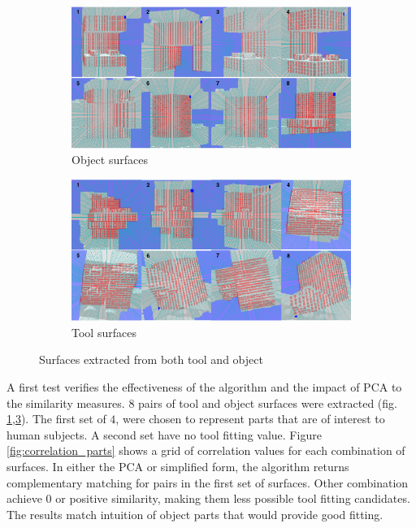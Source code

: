 \documentclass[
    floatsintext
]{article}
\begin{document}
\begin{figure}[!h]
  \centering
  \begin{subfigure}{1\textwidth}
    \includegraphics[width=1\linewidth]{./figures/object_parts.png}
    \caption{Object surfaces}
    \label{fig:obj_parts}
  \end{subfigure}
  \begin{subfigure}{1\textwidth}
    \includegraphics[width=1\linewidth]{./figures/tool_parts.png}
    \caption{Tool surfaces}
    \label{fig:tool_part}
  \end{subfigure}
  \caption{Surfaces extracted from both tool and object}
\end{figure}

A first test verifies the effectiveness of the algorithm and the impact of PCA to the similarity measures. 
$8$ pairs of tool and object surfaces were extracted (fig. \ref{fig:obj_parts},\ref{fig:tool_part}). 
The first set of $4$, were chosen to represent parts that are of interest to human subjects. 
A second set have no tool fitting value. 
Figure \ref{fig:correlation_parts} shows a grid of correlation values for each combination of surfaces. 
In either the PCA or simplified form, the algorithm returns complementary matching for pairs in the first set of surfaces. 
Other combination achieve 0 or positive similarity, making them less possible tool fitting candidates. 
The results match intuition of object parts that would provide good fitting. 
\end{document}
